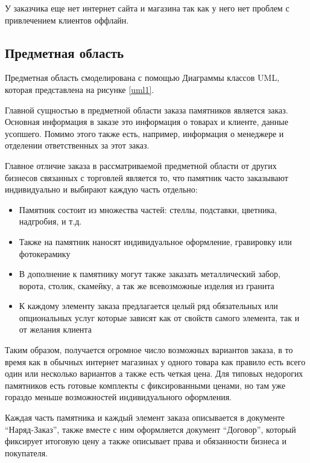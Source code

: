 \documentclass[a4paper,article,14pt]{extarticle}
\begin{document}
У заказчика еще нет интернет сайта и магазина так как у него нет проблем с привлечением клиентов оффлайн.

\subsection{Предметная область}

Предметная область смоделирована с помощью Диаграммы классов UML, которая представлена на рисунке \ref{uml1}.

Главной сущностью в предметной области заказа памятников является заказ.
Основная информация в заказе это информация о товарах и клиенте, данные усопшего.
Помимо этого также есть, например, информация о менеджере и отделении ответственных за этот заказ.

Главное отличие заказа в рассматриваемой предметной области от других бизнесов связанных с торговлей является то, что
памятник часто заказывают индивидуально и выбирают каждую часть отдельно:

\begin{itemize}
    \item Памятник состоит из множества частей: стеллы, подставки, цветника, надгробия, и т.д.
    \item Также на памятник наносят индивидуальное оформление, гравировку или фотокерамику
    \item В дополнение к памятнику могут также заказать металлический забор, ворота, столик, скамейку, а так же всевозможные изделия из гранита
    \item К каждому элементу заказа предлагается целый ряд обязательных 
    или опциональных услуг которые зависят как от свойств самого элемента, так и от желания клиента
\end{itemize}

Таким образом, получается огромное число возможных вариантов заказа, в то время как в обычных интернет магазинах у одного
товара как правило есть всего один или несколько вариантов а также есть четкая цена. 
Для типовых недорогих памятников есть готовые комплекты с фиксированными ценами, 
но там уже гораздо меньше возможностей индивидуального оформления.

Каждая часть памятника и каждый элемент заказа описывается в документе ``Наряд-Заказ'', 
также вместе с ним оформляется документ ``Договор'', который фиксирует итоговую цену а также описывает права и обязанности бизнеса и покупателя.
\end{document}
